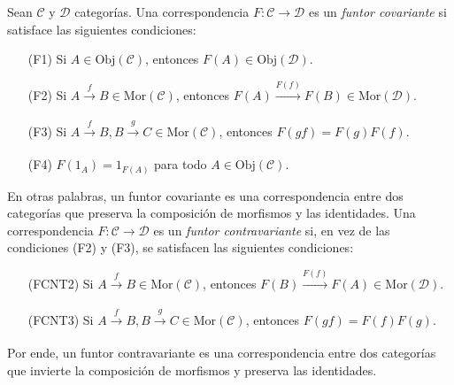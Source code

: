 \documentclass[tesis]{subfiles}
\begin{document}
\begin{Def} \label{Def: Funtor}
    Sean $\mathscr{C}$ y $\mathscr{D}$ categorías. Una correspondencia $F:\mathscr{C}\to \mathscr{D}$ es un \emph{funtor covariante} si satisface las siguientes condiciones:

    \begin{itemize}
    
        \item[(F1)] Si $A\in\text{Obj}(\mathscr{C})$, entonces $F(A)\in\text{Obj}(\mathscr{D})$.

        \item[(F2)] Si $A\xrightarrow[]{f}B\in\text{Mor}(\mathscr{C})$, entonces $F(A)\xrightarrow[]{F(f)} F(B)\in\text{Mor}(\mathscr{D})$.

        \item[(F3)] Si $A\xrightarrow[]{f}B,B\xrightarrow[]{g}C\in\text{Mor}(\mathscr{C})$, entonces $F(gf) = F(g)F(f).$

        \item[(F4)] $F(1_A) = 1_{F(A)}$ para todo $A\in\text{Obj}(\mathscr{C})$.
    \end{itemize}
    En otras palabras, un funtor covariante es una correspondencia entre dos categorías que preserva la composición de morfismos y las identidades. Una correspondencia $F:\mathscr{C}\to \mathscr{D}$ es un \emph{funtor contravariante} si, en vez de las condiciones (F2) y (F3), se satisfacen las siguientes condiciones:

    \begin{itemize}
    
        \item[(FCNT2)] Si $A\xrightarrow[]{f}B\in\text{Mor}(\mathscr{C})$, entonces $F(B)\xrightarrow[]{F(f)}F(A)\in\text{Mor}(\mathscr{D})$.

        \item[(FCNT3)] Si $A\xrightarrow[]{f}B,B\xrightarrow[]{g}C\in\text{Mor}(\mathscr{C})$, entonces $F(gf) = F(f)F(g).$
    \end{itemize}
Por ende, un funtor contravariante es una correspondencia entre dos categorías que invierte la composición de morfismos y preserva las identidades. 
\end{Def}
\end{document}
